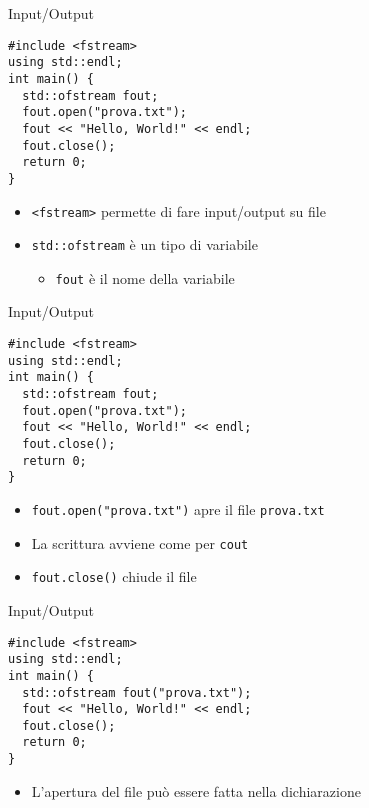 \documentclass[xcolor=dvipsnames,handout]{beamer}
\begin{document}
\begin{frame}[fragile]{Input/Output}
  \vfill
  \begin{lstlisting}
#include <fstream>
using std::endl;
int main() {
  std::ofstream fout;
  fout.open("prova.txt");
  fout << "Hello, World!" << endl;
  fout.close();
  return 0;
}
  \end{lstlisting}
  \vfill
  \begin{itemize}
    \item \lstinline$<fstream>$ permette di fare input/output su file
    \vfill
    \item \lstinline$std::ofstream$ è un tipo di variabile
    \begin{itemize}
      \item \lstinline$fout$ è il nome della variabile
    \end{itemize}
  \end{itemize}
  \vfill
\end{frame}

\begin{frame}[fragile]{Input/Output}
  \vfill
  \begin{lstlisting}
#include <fstream>
using std::endl;
int main() {
  std::ofstream fout;
  fout.open("prova.txt");
  fout << "Hello, World!" << endl;
  fout.close();
  return 0;
}
  \end{lstlisting}
  \vfill
  \begin{itemize}
    \item \lstinline$fout.open("prova.txt")$ apre il file \lstinline$prova.txt$
    \vfill
    \item La scrittura avviene come per \lstinline$cout$
    \vfill
    \item \lstinline$fout.close()$ chiude il file
  \end{itemize}
  \vfill
\end{frame}

\begin{frame}[fragile]{Input/Output}
  \vfill
  \begin{lstlisting}
#include <fstream>
using std::endl;
int main() {
  std::ofstream fout("prova.txt");
  fout << "Hello, World!" << endl;
  fout.close();
  return 0;
}
  \end{lstlisting}
  \vfill
  \begin{itemize}
    \item L'apertura del file può essere fatta nella dichiarazione
  \end{itemize}
  \vfill
\end{frame}
\end{document}

